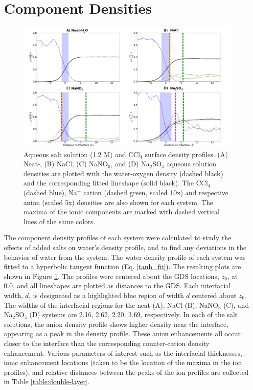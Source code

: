\section{Component Densities}

\begin{figure}[h!]
\begin{center}
	\includegraphics[scale=1.0]{images/densities.png}
	\caption{Aqueous salt solution (1.2 M) and CCl$_4$ surface density profiles. (A) Neat-\ctcwat, (B) NaCl, (C) NaNO$_3$, and (D) Na$_2$SO$_4$ aqueous solution densities are plotted with the water-oxygen density (dashed black) and the corresponding fitted lineshape (solid black). The CCl$_4$ (dashed blue), Na$^+$ cation (dashed green, scaled 10x) and respective anion (scaled 5x) densities are also shown for each system. The maxima of the ionic components are marked with dashed vertical lines of the same colors.}
	\label{fig:density-plots}
\end{center}
\end{figure}

The component density profiles of each system were calculated to study the effects of added salts on water's density profile, and to find any deviations in the behavior of water from the \ctcwat system. The water density profile of each system was fitted to a hyperbolic tangent function (Eq. \ref{tanh_fit}). The resulting plots are shown in Figure \ref{fig:density-plots}. The profiles were centered about the GDS locations, $z_0$, at 0.0\angs, and all lineshapes are plotted as distances to the GDS. Each interfacial width, $d$, is designated as a highlighted blue region of width $d$ centered about $z_0$. The widths of the interfacial regions for the neat-\ctcwat (A), NaCl (B), NaNO$_3$ (C), and Na$_2$SO$_4$ (D) systems are 2.16, 2.62, 2.20, 3.69\angs, respectively. In each of the salt solutions, the anion density profile shows higher density near the interface, appearing as a peak in the density profile. These anion enhancements all occur closer to the interface than the corresponding counter-cation density enhancement. Various parameters of interest such as the interfacial thicknesses, ionic enhancement locations (taken to be the location of the maxima in the ion profiles), and relative distances between the peaks of the ion profiles are collected in Table \ref{table:double-layer}.

